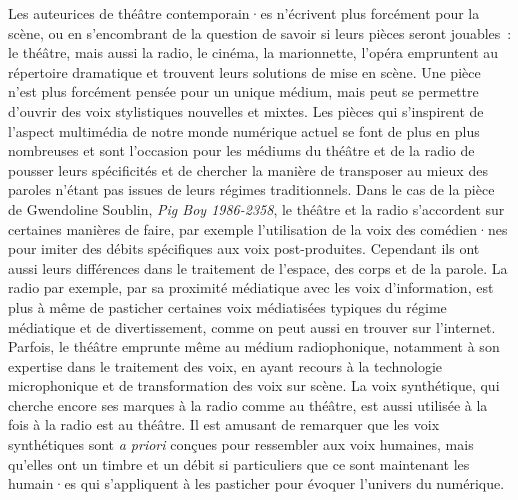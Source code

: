 \documentclass[
]{article}
\begin{document}
Les auteurices de théâtre contemporain·es n'écrivent plus forcément pour la scène, ou en s'encombrant de la question de savoir si leurs pièces seront jouables~: le théâtre, mais aussi la radio, le cinéma, la marionnette, l'opéra empruntent au répertoire dramatique et trouvent leurs solutions de mise en scène. Une pièce n'est plus forcément pensée pour un unique médium, mais peut se permettre d'ouvrir des voix stylistiques nouvelles et mixtes. Les pièces qui s'inspirent de l'aspect multimédia de notre monde numérique actuel se font de plus en plus nombreuses et sont l'occasion pour les médiums du théâtre et de la radio de pousser leurs spécificités et de chercher la manière de transposer au mieux des paroles n'étant pas issues de leurs régimes traditionnels. Dans le cas de la pièce de Gwendoline Soublin, \emph{Pig Boy 1986-2358}, le théâtre et la radio s'accordent sur certaines manières de faire, par exemple l'utilisation de la voix des comédien·nes pour imiter des débits spécifiques aux voix post-produites. Cependant ils ont aussi leurs différences dans le traitement de l'espace, des corps et de la parole. La radio par exemple, par sa proximité médiatique avec les voix d'information, est plus à même de pasticher certaines voix médiatisées typiques du régime médiatique et de divertissement, comme on peut aussi en trouver sur l'internet. Parfois, le théâtre emprunte même au médium radiophonique, notamment à son expertise dans le traitement des voix, en ayant recours à la technologie microphonique et de transformation des voix sur scène. La voix synthétique, qui cherche encore ses marques à la radio comme au théâtre, est aussi utilisée à la fois à la radio est au théâtre. Il est amusant de remarquer que les voix synthétiques sont \emph{a priori} conçues pour ressembler aux voix humaines, mais qu'elles ont un timbre et un débit si particuliers que ce sont maintenant les humain·es qui s'appliquent à les pasticher pour évoquer l'univers du numérique.
\end{document}
